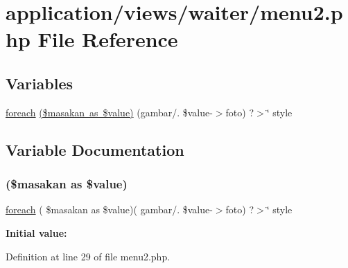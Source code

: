 \hypertarget{waiter_2menu2_8php}{}\section{application/views/waiter/menu2.php File Reference}
\label{waiter_2menu2_8php}
\subsection*{Variables}
\begin{DoxyCompactItemize}
\item 
\mbox{\hyperlink{pdetailorder_8php_a2e23c42e9b59be6e2bbc1bac76422d34}{foreach}} \mbox{\hyperlink{waiter_2menu2_8php_ab1733b3bf6e3b009e46127d10e8c7a46}{(\$masakan as \$value)}} (\textquotesingle{}gambar/\textquotesingle{}. \$value-\/$>$foto) ?$>$\char`\"{} style
\end{DoxyCompactItemize}


\subsection{Variable Documentation}
\mbox{\label{waiter_2menu2_8php_ab1733b3bf6e3b009e46127d10e8c7a46}} 
\subsubsection{\texorpdfstring{(\$masakan as \$value)}{($masakan as $value)}}
{\footnotesize\ttfamily \mbox{\hyperlink{pdetailorder_8php_a2e23c42e9b59be6e2bbc1bac76422d34}{foreach}} ( \$masakan as \$value)( \textquotesingle{}gambar/\textquotesingle{}. \$value-\/$>$foto) ?$>$\char`\"{} style}

{\bfseries Initial value\+:}
\begin{DoxyCode}{0}

\end{DoxyCode}


Definition at line 29 of file menu2.\+php.

